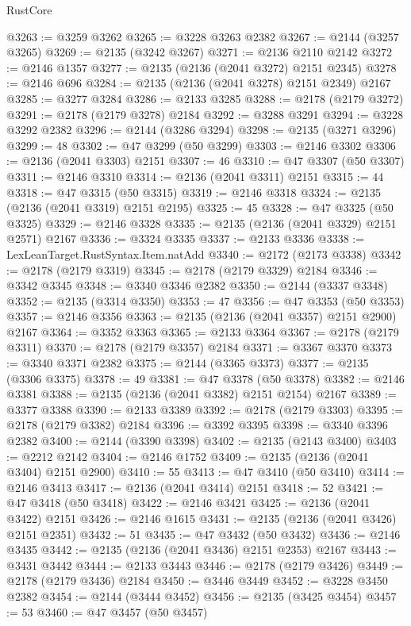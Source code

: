 \begin{lexlean}{RustCore}
\begin{coremodule}
@3263 := @3259 @3262
@3265 := @3228 @3263 @2382
@3267 := @2144 (@3257 @3265)
@3269 := @2135 (@3242 @3267)
@3271 := @2136 @2110 @2142
@3272 := @2146 @1357
@3277 := @2135 (@2136 (@2041 @3272) @2151 @2345)
@3278 := @2146 @696
@3284 := @2135 (@2136 (@2041 @3278) @2151 @2349) @2167
@3285 := @3277 @3284
@3286 := @2133 @3285
@3288 := @2178 (@2179 @3272)
@3291 := @2178 (@2179 @3278) @2184
@3292 := @3288 @3291
@3294 := @3228 @3292 @2382
@3296 := @2144 (@3286 @3294)
@3298 := @2135 (@3271 @3296)
@3299 := 48
@3302 := @47 @3299 (@50 @3299)
@3303 := @2146 @3302
@3306 := @2136 (@2041 @3303) @2151
@3307 := 46
@3310 := @47 @3307 (@50 @3307)
@3311 := @2146 @3310
@3314 := @2136 (@2041 @3311) @2151
@3315 := 44
@3318 := @47 @3315 (@50 @3315)
@3319 := @2146 @3318
@3324 := @2135 (@2136 (@2041 @3319) @2151 @2195)
@3325 := 45
@3328 := @47 @3325 (@50 @3325)
@3329 := @2146 @3328
@3335 := @2135 (@2136 (@2041 @3329) @2151 @2571) @2167
@3336 := @3324 @3335
@3337 := @2133 @3336
@3338 := LexLeanTarget.RustSyntax.Item.natAdd
@3340 := @2172 (@2173 @3338)
@3342 := @2178 (@2179 @3319)
@3345 := @2178 (@2179 @3329) @2184
@3346 := @3342 @3345
@3348 := @3340 @3346 @2382
@3350 := @2144 (@3337 @3348)
@3352 := @2135 (@3314 @3350)
@3353 := 47
@3356 := @47 @3353 (@50 @3353)
@3357 := @2146 @3356
@3363 := @2135 (@2136 (@2041 @3357) @2151 @2900) @2167
@3364 := @3352 @3363
@3365 := @2133 @3364
@3367 := @2178 (@2179 @3311)
@3370 := @2178 (@2179 @3357) @2184
@3371 := @3367 @3370
@3373 := @3340 @3371 @2382
@3375 := @2144 (@3365 @3373)
@3377 := @2135 (@3306 @3375)
@3378 := 49
@3381 := @47 @3378 (@50 @3378)
@3382 := @2146 @3381
@3388 := @2135 (@2136 (@2041 @3382) @2151 @2154) @2167
@3389 := @3377 @3388
@3390 := @2133 @3389
@3392 := @2178 (@2179 @3303)
@3395 := @2178 (@2179 @3382) @2184
@3396 := @3392 @3395
@3398 := @3340 @3396 @2382
@3400 := @2144 (@3390 @3398)
@3402 := @2135 (@2143 @3400)
@3403 := @2212 @2142
@3404 := @2146 @1752
@3409 := @2135 (@2136 (@2041 @3404) @2151 @2900)
@3410 := 55
@3413 := @47 @3410 (@50 @3410)
@3414 := @2146 @3413
@3417 := @2136 (@2041 @3414) @2151
@3418 := 52
@3421 := @47 @3418 (@50 @3418)
@3422 := @2146 @3421
@3425 := @2136 (@2041 @3422) @2151
@3426 := @2146 @1615
@3431 := @2135 (@2136 (@2041 @3426) @2151 @2351)
@3432 := 51
@3435 := @47 @3432 (@50 @3432)
@3436 := @2146 @3435
@3442 := @2135 (@2136 (@2041 @3436) @2151 @2353) @2167
@3443 := @3431 @3442
@3444 := @2133 @3443
@3446 := @2178 (@2179 @3426)
@3449 := @2178 (@2179 @3436) @2184
@3450 := @3446 @3449
@3452 := @3228 @3450 @2382
@3454 := @2144 (@3444 @3452)
@3456 := @2135 (@3425 @3454)
@3457 := 53
@3460 := @47 @3457 (@50 @3457)

\end{coremodule}
\end{lexlean}
